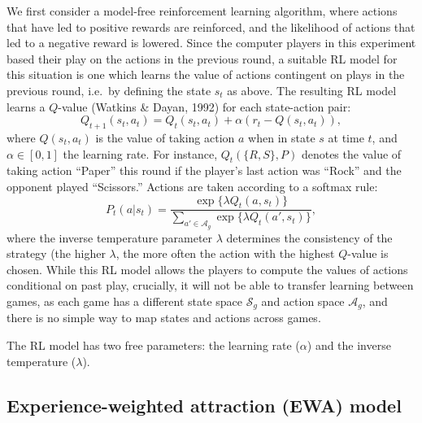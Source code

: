 \documentclass[
  english,
  man,floatsintext]{apa6}
\begin{document}
We first consider a model-free reinforcement learning algorithm, where actions that have led to positive rewards are reinforced, and the likelihood of actions that led to a negative reward is lowered. Since the computer players in this experiment based their play on the actions in the previous round, a suitable RL model for this situation is one which learns the value of actions contingent on plays in the previous round, i.e.~by defining the state \(s_{t}\) as above. The resulting RL model learns a \(Q\)-value (Watkins \& Dayan, 1992) for each state-action pair:
\[Q_{t+1}(s_{t},a_{t}) = Q_{t}(s_{t},a_{t}) + \alpha \left( r_{t}  - Q(s_{t},a_{t}) \right) ,\]
where \(Q(s_{t},a_{t})\) is the value of taking action \(a\) when in state \(s\) at time \(t\), and \(\alpha \in [0,1]\) the learning rate. For instance, \(Q_t(\{R,S\},P)\) denotes the value of taking action ``Paper'' this round if the player's last action was ``Rock'' and the opponent played ``Scissors.'' Actions are taken according to a softmax rule:
\[P_{t}(a|s_t) = \frac{\exp \{ \lambda Q_{t}(a,s_t) \}}{\sum_{a' \in \mathcal{A}_g} \exp \{\lambda  Q_{t}(a',s_t) \}}, \]
where the inverse temperature parameter \(\lambda\) determines the consistency of the strategy (the higher \(\lambda\), the more often the action with the highest \(Q\)-value is chosen. While this RL model allows the players to compute the values of actions conditional on past play, crucially, it will not be able to transfer learning between games, as each game has a different state space \(\mathcal{S}_g\) and action space \(\mathcal{A}_g\), and there is no simple way to map states and actions across games.

The RL model has two free parameters: the learning rate (\(\alpha\)) and the inverse temperature (\(\lambda\)).

\hypertarget{experience-weighted-attraction-ewa-model}{%
\subsection{Experience-weighted attraction (EWA) model}\label{experience-weighted-attraction-ewa-model}}
\end{document}
